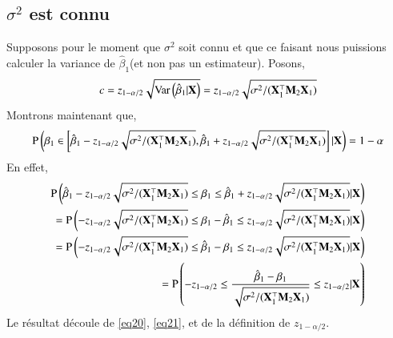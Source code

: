 \documentclass[10pt, reqno]{amsart}
\begin{document}
\subsection{$\sigma^2$ est connu}
Supposons pour le moment que $\sigma^2$ soit connu et que ce faisant nous puissions calculer la variance de $\hat{\beta}_1$(et non pas un estimateur). Posons,
\begin{align*}
c = z_{1-\alpha/2}\sqrt{\operatorname{Var}\left(\hat{\beta} _1| \mathbf X \right)}=z_{1-\alpha/2}\sqrt{\sigma^2/(\mathbf X_1^\top\mathbf M_2\mathbf X_1)}
\end{align*}
Montrons maintenant que,
\begin{align*}
\operatorname{P}\left(
\beta_1 \in \left[\hat{\beta}_1 -z_{1-\alpha/2}\sqrt{\sigma^2/(\mathbf X_1^\top\mathbf M_2\mathbf X_1)} , \hat{\beta}_1+
z_{1-\alpha/2}\sqrt{\sigma^2/(\mathbf X_1^\top\mathbf M_2\mathbf X_1)} \right] | \mathbf X\right) = 1-\alpha
\end{align*}
En effet,
\begin{align}
\operatorname{P}\left(
\hat{\beta}_1 -z_{1-\alpha/2}\sqrt{\sigma^2/(\mathbf X_1^\top\mathbf M_2\mathbf X_1)}
\leq \beta_1 \leq
\hat{\beta}_1+
z_{1-\alpha/2}\sqrt{\sigma^2/(\mathbf X_1^\top\mathbf M_2\mathbf X_1)}  | \mathbf X
\right) \nonumber\\
=\operatorname{P}\left(
-z_{1-\alpha/2}\sqrt{\sigma^2/(\mathbf X_1^\top\mathbf M_2\mathbf X_1)}
\leq \beta_1 - \hat{\beta}_1 \leq
z_{1-\alpha/2}\sqrt{\sigma^2/(\mathbf X_1^\top\mathbf M_2\mathbf X_1)}  | \mathbf X
\right)\nonumber\\
=\operatorname{P}\left(
-z_{1-\alpha/2}\sqrt{\sigma^2/(\mathbf X_1^\top\mathbf M_2\mathbf X_1)}
\leq  \hat{\beta}_1-\beta_1 \leq
z_{1-\alpha/2}\sqrt{\sigma^2/(\mathbf X_1^\top\mathbf M_2\mathbf X_1)}  | \mathbf X
\right)\nonumber\\
=
\operatorname{P}\left(
-z_{1-\alpha/2}
\leq  \frac{\hat{\beta}_1-\beta_1}{\sqrt{\sigma^2/(\mathbf X_1^\top\mathbf M_2\mathbf X_1)}} \leq
z_{1-\alpha/2}  | \mathbf X
\right)
\label{eq21}
\end{align}
Le résultat découle de \eqref{eq20}, \eqref{eq21}, et de la définition de $z_{1-\alpha/2}$.
\end{document}
